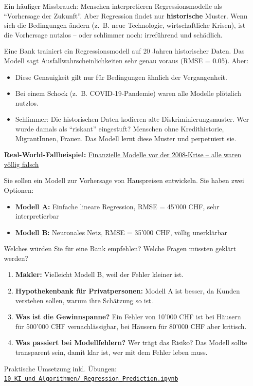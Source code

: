 \begin{mydefinition}
Ein häufiger Missbrauch: Menschen interpretieren Regressionsmodelle als \enquote{Vorhersage der Zukunft}. Aber Regression findet nur \textbf{historische} Muster. Wenn sich die Bedingungen ändern (z.~B. neue Technologie, wirtschaftliche Krisen), ist die Vorhersage nutzlos -- oder schlimmer noch: irreführend und schädlich.
\end{mydefinition}

\begin{myexample}
Eine Bank trainiert ein Regressionsmodell auf 20 Jahren historischer Daten. Das Modell sagt Ausfallwahrscheinlichkeiten sehr genau voraus (RMSE = 0.05). Aber:
\begin{itemize}
    \item Diese Genauigkeit gilt nur für Bedingungen ähnlich der Vergangenheit.
    \item Bei einem Schock (z.~B. COVID-19-Pandemie) waren alle Modelle plötzlich nutzlos.
    \item Schlimmer: Die historischen Daten kodieren alte Diskriminierungsmuster. Wer wurde damals als \enquote{riskant} eingestuft? Menschen ohne Kredithistorie, MigrantInnen, Frauen. Das Modell lernt diese Muster und perpetuiert sie.
\end{itemize}
\textbf{Real-World-Fallbeispiel:} \href{https://en.wikipedia.org/wiki/2008_financial_crisis}{Finanzielle Modelle vor der 2008-Krise -- alle waren völlig falsch}
\end{myexample}

\begin{mychallenge}
Sie sollen ein Modell zur Vorhersage von Hauspreisen entwickeln. Sie haben zwei Optionen:
\begin{itemize}
    \item \textbf{Modell A:} Einfache lineare Regression, RMSE = 45'000 CHF, sehr interpretierbar
    \item \textbf{Modell B:} Neuronales Netz, RMSE = 35'000 CHF, völlig unerklärbar
\end{itemize}
Welches würden Sie für eine Bank empfehlen? Welche Fragen müssten geklärt werden?
\begin{myanswer}
    \begin{enumerate}
        \item \textbf{Makler:} Vielleicht Modell B, weil der Fehler kleiner ist.
        \item \textbf{Hypothekenbank für Privatpersonen:} Modell A ist besser, da Kunden verstehen sollen, warum ihre Schätzung so ist.
        \item \textbf{Was ist die Gewinnspanne?} Ein Fehler von 10'000 CHF ist bei Häusern für 500'000 CHF vernachlässigbar, bei Häusern für 80'000 CHF aber kritisch.
        \item \textbf{Was passiert bei Modellfehlern?} Wer trägt das Risiko? Das Modell sollte transparent sein, damit klar ist, wer mit dem Fehler leben muss.
    \end{enumerate}
\end{myanswer}
\end{mychallenge}

\begin{myremark}[Notebook]
Praktische Umsetzung inkl. Übungen:\newline
\href{\notebookurl}{\texttt{10\_KI\_und\_Algorithmen/\_Regression\_Prediction.ipynb}}
\end{myremark}
